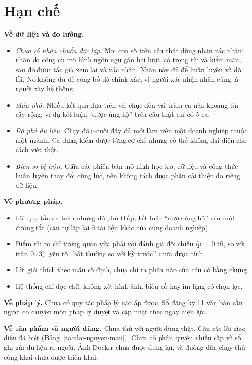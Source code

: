 \section{Hạn chế}\label{sec:han-che}

\textbf{Về dữ liệu và đo lường.}
\begin{itemize}
\item \emph{Chưa có nhãn chuẩn độc lập.} Mọi con số trên câu thật dùng nhãn xác nhận: nhãn do công cụ mô hình ngôn ngữ gán hai lượt, có trọng tài và kiểm mẫu, sau đó được tác giả xem lại và xác nhận. Nhãn này đủ để huấn luyện và dò lỗi. Nó không đủ để công bố độ chính xác, vì người xác nhận nhãn cũng là người xây hệ thống.
\item \emph{Mẫu nhỏ.} Nhiều kết quả dựa trên vài chục đến vài trăm ca nên khoảng tin cậy rộng; ví dụ kết luận “được ủng hộ” trên câu thật chỉ có 5 ca.
\item \emph{Độ phủ dữ liệu.} Chạy đầu–cuối đầy đủ mới làm trên một doanh nghiệp thuộc một ngành. Ca dựng kiểm được từng cơ chế nhưng có thể không đại diện cho cách viết thật.
\item \emph{Biến số bị trộn.} Giữa các phiên bản mô hình học trò, dữ liệu và công thức huấn luyện thay đổi cùng lúc, nên không tách được phần cải thiện do riêng dữ liệu.
\end{itemize}

\textbf{Về phương pháp.}
\begin{itemize}
\item Lõi quy tắc an toàn nhưng độ phủ thấp; kết luận “được ủng hộ” còn một đường tắt (câu tự lặp lại ở tài liệu khác của cùng doanh nghiệp).
\item Điểm rủi ro chỉ tương quan vừa phải với đánh giá đối chiếu (ρ = 0,46, so với trần 0,73); yếu tố “bất thường so với kỳ trước” chưa được tính.
\item Lời giải thích theo mẫu cố định, chưa chỉ ra phần nào của câu có bằng chứng.
\item Hệ thống chỉ đọc chữ; không xét hình ảnh, biểu đồ hay im lặng có chọn lọc.
\end{itemize}

\textbf{Về pháp lý.} Chưa có quy tắc pháp lý nào áp được. Sổ đăng ký 11 văn bản cần người có chuyên môn pháp lý duyệt và cập nhật theo ngày hiệu lực.

\textbf{Về sản phẩm và người dùng.} Chưa thử với người dùng thật. Còn các lỗi giao diện đã biết (Bảng~\ref{tab:loi-nguyen-mau}). Chưa có phân quyền nhiều cấp và sổ ghi gửi dữ liệu ra ngoài. Ảnh Docker chưa được dựng lại, và đường dẫn chạy thử công khai chưa được triển khai.

